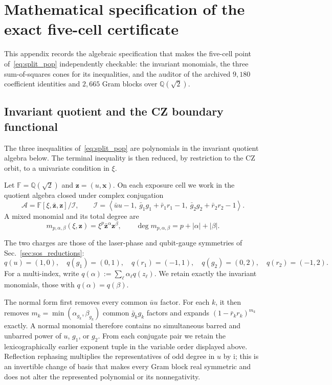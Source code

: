 \documentclass[aps,prx,reprint,nofootinbib,longbibliography,floatfix]{revtex4-2}
\theoremstyle{plain}
\theoremstyle{remark}
\newcommand{\ii}{\mathrm{i}}
\newcommand{\xv}{\boldsymbol{x}}
\newcommand{\zv}{\boldsymbol{z}}
\begin{document}
\section{Mathematical specification of the exact five-cell certificate}
\label{app:split_certificate}

This appendix records the algebraic specification that makes the five-cell
point of~\eqref{eq:split_pop} independently checkable: the invariant
monomials, the three sum-of-squares cones for its inequalities, and the
auditor of the archived $9{,}180$ coefficient identities and $2{,}665$ Gram
blocks over $\mathbb{Q}(\sqrt{2})$.

\subsection{Invariant quotient and the CZ boundary functional}
\label{app:terminal_quotient}
The three inequalities of~\eqref{eq:split_pop} are polynomials in the
invariant quotient algebra below. The terminal inequality is then reduced,
by restriction to the CZ orbit, to a univariate condition in $\xi$.

Let $\mathbb F=\mathbb Q(\sqrt2)$ and $\zv=(u,\xv)$. On each
exposure cell we work in the quotient algebra closed under complex conjugation
\begin{equation}
\mathcal A
=\mathbb F[\xi,\bar{\zv},\zv]/\mathcal I,
\qquad
\mathcal I=\left\langle
\bar uu-1,\ \bar g_1g_1+\bar r_1r_1-1,\
\bar g_2g_2+\bar r_2r_2-1
\right\rangle.
\label{eq:quotient_algebra}
\end{equation}
A mixed monomial and its total degree are
\begin{equation}
m_{p,\alpha,\beta}(\xi,\zv)=\xi^p\bar{\zv}^\alpha \zv^\beta,
\qquad
\deg m_{p,\alpha,\beta}=p+|\alpha|+|\beta|.
\label{eq:mixed_monomial}
\end{equation}

The two charges are those of the laser-phase and qubit-gauge symmetries of
Sec.~\ref{sec:sos_reductions}:
\begin{equation}
q(u)=(1,0),\quad q(g_1)=(0,1),\quad q(r_1)=(-1,1),
\quad q(g_2)=(0,2),\quad q(r_2)=(-1,2).
\label{eq:variable_charges}
\end{equation}
For a multi-index, write $q(\alpha):=\sum_\ell\alpha_\ell q(z_\ell)$. We retain
exactly the invariant monomials, those with $q(\alpha)=q(\beta)$.

The normal form first removes every common $\bar uu$ factor. For each $k$, it then removes
$m_k=\min(\alpha_{g_k},\beta_{g_k})$ common $\bar g_kg_k$ factors and expands
$(1-\bar r_kr_k)^{m_k}$ exactly. A normal monomial therefore contains no
simultaneous barred and unbarred power of $u$, $g_1$, or $g_2$. From each
conjugate pair we retain the lexicographically earlier exponent tuple in the
variable order displayed above. Reflection rephasing multiplies the
representatives of odd degree in $u$ by $\ii$; this is an invertible
change of basis that makes every Gram block real symmetric and does not alter
the represented polynomial or its nonnegativity.
\end{document}
